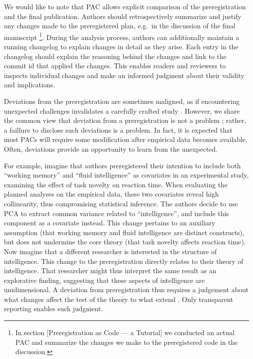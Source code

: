 \documentclass[psych,tutorial,submit,moreauthors,pdftex]{mdpi}
\begin{document}
We would like to note that PAC allows explicit comparison of the
preregistration and the final publication. Authors should
retrospectively summarize and justify any changes made to the
preregistered plan, e.g.~in the discussion of the final manuscript
\footnote{In section {[}Preregistration as Code --- a Tutorial{]} we
  conducted an actual PAC and summarize the changes we make to the
  preregistered code in the discussion.}. During the analysis process,
authors can additionally maintain a running changelog to explain changes
in detail as they arise. Each entry in the changelog should explain the
reasoning behind the changes and link to the commit id that applied the
changes. This enables readers and reviewers to inspects individual
changes and make an informed judgment about their validity and
implications.

Deviations from the preregistration are sometimes maligned, as if
encountering unexpected challenges invalidates a carefully crafted study
\citep{szollosi_is_2020}. However, we share the common view that
deviation from a preregistration is not a problem
\citep{nosekPreregistrationHardWorthwhile2019}; rather, a faillure to
disclose such deviations is a problem. In fact, it is expected that most
PACs will require some modification after empirical data becomes
available. Often, deviations provide an opportunity to learn from the
unexpected.

For example, imagine that authors preregistered their intention to
include both ``working memory'' and ``fluid intelligence'' as covariates
in an experimental study, examining the effect of task novelty on
reaction time. When evaluating the planned analyses on the empirical
data, these two covariates reveal high collinearity, thus compromising
statistical inference. The authors decide to use PCA to extract common
variance related to ``intelligence'', and include this component as a
covariate instead. This change pertains to an auxiliary assumption (that
working memory and fluid intelligence are distinct constructs), but does
not undermine the core theory (that task novelty affects reaction time).
Now imagine that a different researcher is interested in the structure
of intelligence. This change to the preregistration directly relates to
their theory of intelligence. That researcher might thus interpret the
same result as an explorative finding, suggesting that these aspects of
intelligence are unidimensional. A deviation from preregistration thus
requires a judgement about what changes affect the test of the theory to
what extend \citep{meehlTheoreticalRisksTabular1978}. Only transparent
reporting enables such judgment.
\end{document}
